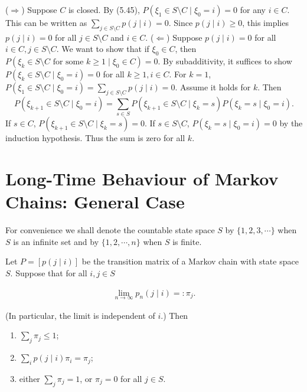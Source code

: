 \begin{Solution}
($\Rightarrow$) Suppose $C$ is closed. By (5.45), $P(\xi_1 \in S \setminus C \mid \xi_0 = i) = 0$ for any $i \in C$.
This can be written as $\sum_{j \in S \setminus C} p(j \mid i) = 0$.
Since $p(j \mid i) \geq 0$, this implies $p(j \mid i) = 0$ for all $j \in S \setminus C$ and $i \in C$.
($\Leftarrow$) Suppose $p(j \mid i) = 0$ for all $i \in C, j \in S \setminus C$.
We want to show that if $\xi_0 \in C$, then $P(\xi_k \in S \setminus C \text{ for some } k \geq 1 \mid \xi_0 \in C) = 0$.
By subadditivity, it suffices to show $P(\xi_k \in S \setminus C \mid \xi_0 = i) = 0$ for all $k \geq 1, i \in C$.
For $k=1$, $P(\xi_1 \in S \setminus C \mid \xi_0 = i) = \sum_{j \in S \setminus C} p(j \mid i) = 0$.
Assume it holds for $k$. Then
\[
P(\xi_{k+1} \in S \setminus C \mid \xi_0 = i) = \sum_{s \in S} P(\xi_{k+1} \in S \setminus C \mid \xi_k = s) P(\xi_k = s \mid \xi_0 = i).
\]
If $s \in C$, $P(\xi_{k+1} \in S \setminus C \mid \xi_k = s) = 0$.
If $s \in S \setminus C$, $P(\xi_k = s \mid \xi_0 = i) = 0$ by the induction hypothesis.
Thus the sum is zero for all $k$.
\end{Solution}

\section{Long-Time Behaviour of Markov Chains: General Case}
\label{sec:long-time-general}

For convenience we shall denote the countable state space $S$ by $\{1,2,3,\cdots\}$ when $S$ is an infinite set and by $\{1,2,\cdots,n\}$ when $S$ is finite.

\begin{Proposition}
\label{prp:limit-implies-invariant}
Let $P = [p(j \mid i)]$ be the transition matrix of a Markov chain with state space $S$. Suppose that for all $i,j\in S$

\begin{align}
\lim_{n\to\infty} p_n(j \mid i) =: \pi_j. \tag{5.47}
\end{align}

(In particular, the limit is independent of $i$.) Then

\begin{enumerate}
\item $\sum_j \pi_j \leq 1$;
\item $\sum_i p(j \mid i) \pi_i = \pi_j$;
\item either $\sum_j \pi_j = 1$, or $\pi_j = 0$ for all $j\in S$.
\end{enumerate}
\end{Proposition}

